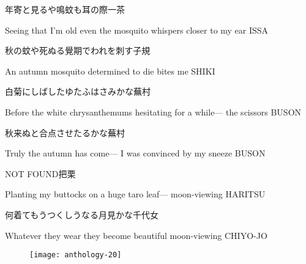 \begin{haiku}
    {\FH 年寄と見るや鳴蚊も耳の際}\hfill{\FH 一茶}

    \vin{} Seeing that I'm old
    \vin{} \vin{} even the mosquito whispers
    \vin{} \vin{} \vin{} closer to my ear \hspace{\fill} ISSA
\end{haiku}

\begin{haiku}
    {\FH 秋の蚊や死ぬる覺期でわれを刺す}\hfill{\FH 子規}

    \vin{} An autumn mosquito
    \vin{} \vin{} determined to die
    \vin{} \vin{} \vin{} bites me \hspace{\fill} SHIKI
\end{haiku}

\begin{haiku}
    {\FH 白菊にしばしたゆたふはさみかな}\hfill{\FH 蕪村}

    \vin{} Before the white chrysanthemums
    \vin{} \vin{} hesitating for a while---
    \vin{} \vin{} \vin{} the scissors \hspace{\fill} BUSON
\end{haiku}

\begin{haiku}
    {\FH 秋来ぬと合点させたるかな}\hfill{\FH 蕪村}

    \vin{} Truly the autumn has come---
    \vin{} \vin{} I was convinced
    \vin{} \vin{} \vin{} by my sneeze \hspace{\fill} BUSON
\end{haiku}

\begin{haiku}
    NOT FOUND\hfill{\FH 把栗}

    \vin{} Planting my buttocks
    \vin{} \vin{} on a huge taro leaf---
    \vin{} \vin{} \vin{} moon-viewing \hspace{\fill} HARITSU
\end{haiku}

\begin{haiku}
    {\FH 何着てもうつくしうなる月見かな}\hfill{\FH 千代女}

    \vin{} Whatever they wear
    \vin{} \vin{} they become beautiful
    \vin{} \vin{} \vin{} moon-viewing \hspace{\fill} CHIYO-JO
\end{haiku}

\begin{figure}
    \texttt{[image: anthology-20]}
\end{figure}

